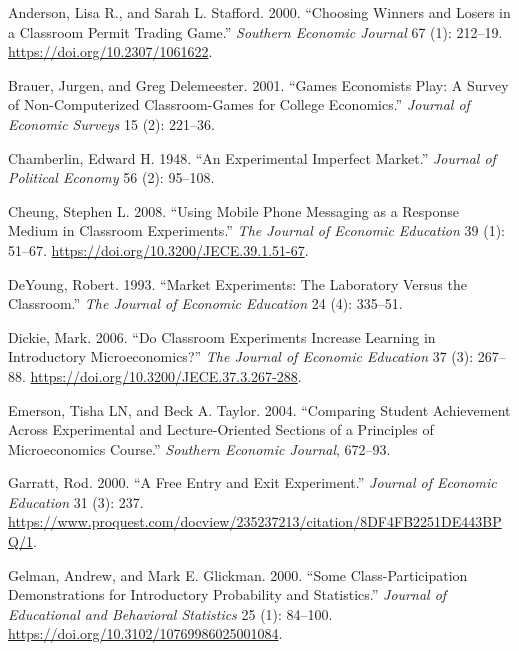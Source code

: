 \documentclass[
]{article}
\newlength{\cslhangindent}
\newlength{\cslentryspacingunit} %
\newenvironment{CSLReferences}[2] %
 {%
  \setlength{\parindent}{0pt}
  \ifodd #1
  \let\oldpar\par
  \def\par{\hangindent=\cslhangindent\oldpar}
  \fi
  \setlength{\parskip}{#2\cslentryspacingunit}
 }%
 {}
\begin{document}
\hypertarget{refs}{}
\begin{CSLReferences}{1}{0}
\leavevmode{}%
Anderson, Lisa R., and Sarah L. Stafford. 2000. {``Choosing Winners and
Losers in a Classroom Permit Trading Game.''} \emph{Southern Economic
Journal} 67 (1): 212--19. \url{https://doi.org/10.2307/1061622}.

\leavevmode{}%
Brauer, Jurgen, and Greg Delemeester. 2001. {``Games Economists Play:
{A} Survey of Non-Computerized Classroom-Games for College Economics.''}
\emph{Journal of Economic Surveys} 15 (2): 221--36.

\leavevmode{}%
Chamberlin, Edward H. 1948. {``An Experimental Imperfect Market.''}
\emph{Journal of Political Economy} 56 (2): 95--108.

\leavevmode{}%
Cheung, Stephen L. 2008. {``Using {Mobile} {Phone} {Messaging} as a
{Response} {Medium} in {Classroom} {Experiments}.''} \emph{The Journal
of Economic Education} 39 (1): 51--67.
\url{https://doi.org/10.3200/JECE.39.1.51-67}.

\leavevmode{}%
DeYoung, Robert. 1993. {``Market Experiments: {The} Laboratory Versus
the Classroom.''} \emph{The Journal of Economic Education} 24 (4):
335--51.

\leavevmode{}%
Dickie, Mark. 2006. {``Do {Classroom} {Experiments} {Increase}
{Learning} in {Introductory} {Microeconomics}?''} \emph{The Journal of
Economic Education} 37 (3): 267--88.
\url{https://doi.org/10.3200/JECE.37.3.267-288}.

\leavevmode{}%
Emerson, Tisha LN, and Beck A. Taylor. 2004. {``Comparing Student
Achievement Across Experimental and Lecture-Oriented Sections of a
Principles of Microeconomics Course.''} \emph{Southern Economic
Journal}, 672--93.

\leavevmode{}%
Garratt, Rod. 2000. {``A Free Entry and Exit Experiment.''}
\emph{Journal of Economic Education} 31 (3): 237.
\url{https://www.proquest.com/docview/235237213/citation/8DF4FB2251DE443BPQ/1}.

\leavevmode{}%
Gelman, Andrew, and Mark E. Glickman. 2000. {``Some Class-Participation
Demonstrations for Introductory Probability and Statistics.''}
\emph{Journal of Educational and Behavioral Statistics} 25 (1): 84--100.
\url{https://doi.org/10.3102/10769986025001084}.


\end{CSLReferences}
\end{document}
